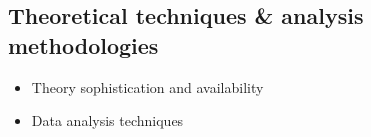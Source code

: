 \subsection{Theoretical techniques \& analysis methodologies}

\begin{itemize}
\item Theory sophistication and availability
\item Data analysis techniques
\end{itemize}